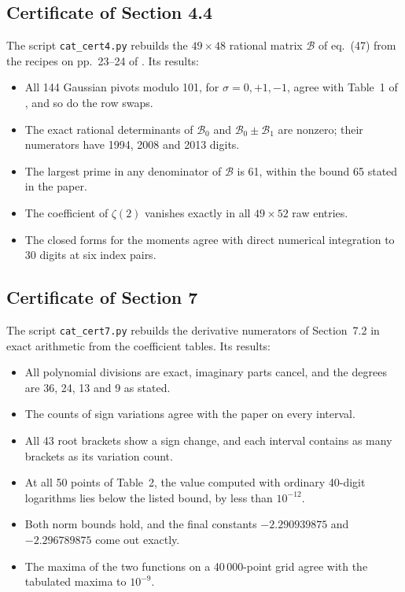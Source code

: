 \documentclass[11pt]{article}
\begin{document}
\subsection{Certificate of Section 4.4}

The script \texttt{cat\_cert4.py} rebuilds the $49\times48$ rational matrix $\mathcal{B}$ of eq.~(47) from the recipes on pp.~23--24 of \cite{OAI}. Its results:
\begin{itemize}
\item All 144 Gaussian pivots modulo 101, for $\sigma=0,+1,-1$, agree with Table~1 of \cite{OAI}, and so do the row swaps.
\item The exact rational determinants of $\mathcal{B}_0$ and $\mathcal{B}_0\pm\mathcal{B}_1$ are nonzero; their numerators have 1994, 2008 and 2013 digits.
\item The largest prime in any denominator of $\mathcal{B}$ is 61, within the bound 65 stated in the paper.
\item The coefficient of $\zeta(2)$ vanishes exactly in all $49\times52$ raw entries.
\item The closed forms for the moments agree with direct numerical integration to 30 digits at six index pairs.
\end{itemize}

\subsection{Certificate of Section 7}

The script \texttt{cat\_cert7.py} rebuilds the derivative numerators of Section~7.2 in exact arithmetic from the coefficient tables. Its results:
\begin{itemize}
\item All polynomial divisions are exact, imaginary parts cancel, and the degrees are 36, 24, 13 and 9 as stated.
\item The counts of sign variations agree with the paper on every interval.
\item All 43 root brackets show a sign change, and each interval contains as many brackets as its variation count.
\item At all 50 points of Table~2, the value computed with ordinary 40-digit logarithms lies below the listed bound, by less than $10^{-12}$.
\item Both norm bounds hold, and the final constants $-2.290939875$ and $-2.296789875$ come out exactly.
\item The maxima of the two functions on a 40\,000-point grid agree with the tabulated maxima to $10^{-9}$.
\end{itemize}
\end{document}
